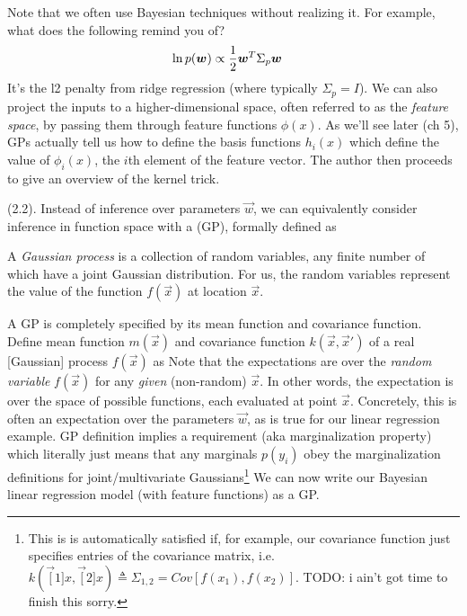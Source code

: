 \documentclass[11pt]{article}
\begin{document}
Note that we often use Bayesian techniques without realizing it. For example, what does the following remind you of?
\begin{align}
	\ln p(\bm{w}_{}) 
		&\propto \frac{1}{2} \bm{w}_{}^T \Sigma_p \bm{w}_{}
\end{align} 
It's the l2 penalty from ridge regression (where typically $\Sigma_p = I$). We can also project the inputs to a higher-dimensional space, often referred to as the \textit{feature space}, by passing them through feature functions $\phi(x)$. As we'll see later (ch 5), GPs actually tell us how to define the basis functions $h_i(x)$ which define the value of $\phi_i(x)$, the $i$th element of the feature vector.  The author then proceeds to give an overview of the kernel trick.  

\myspace
\p {} (2.2). Instead of inference over parameters $\vec w$, we can equivalently consider inference in function space with a  (GP), formally defined as
\begin{definition}
	A \textit{Gaussian process} is a collection of random variables, any finite number of which have a joint Gaussian distribution. For us, the random variables represent the value of the function $f(\vec x)$ at location $\vec x$. 
\end{definition}
A GP is completely specified by its mean function and covariance function. Define mean function $m(\vec x)$ and covariance function $k(\vec x, \vec{x}')$ of a real [Gaussian] process $f(\vec x)$ as
Note that the expectations are over the \textit{random variable} $f(\vec x)$ for any \textit{given} (non-random) $\vec x$. In other words, the expectation is over the space of possible functions, each evaluated at point $\vec x$. Concretely, this is often an expectation over the parameters $\vec w$, as is true for our linear regression example. GP definition implies a  requirement (aka marginalization property) which literally just means that any marginals $p(y_i)$ obey the marginalization definitions for joint/multivariate Gaussians\footnote{This is is automatically satisfied if, for example, our covariance function just specifies entries of the covariance matrix, i.e. $k(\vec[1]{x}, \vec[2]{x}) \triangleq \Sigma_{1, 2} = Cov[f(x_1), f(x_2)]$. TODO: i ain't got time to finish this sorry.  } We can now write our Bayesian linear regression model (with feature functions) as a GP.
\end{document}
